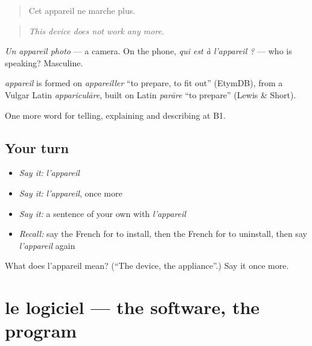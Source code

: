 \begin{quote}
Cet appareil ne marche plus.
\end{quote}

\begin{quote}
\emph{This device does not work any more.}
\end{quote}

\emph{Un appareil photo} — a camera. On the phone, \emph{qui est à l'appareil ?} — who is speaking? Masculine.

\begin{cousinweb}
\emph{appareil} is formed on \emph{appareiller} \textquotedblleft{}to prepare, to fit out\textquotedblright{} (EtymDB), from a Vulgar Latin \emph{appariculāre}, built on Latin \emph{parāre} \textquotedblleft{}to prepare\textquotedblright{} (Lewis \& Short).
\end{cousinweb}

\begin{grammarlens}[title={What you've built}]
One more word for telling, explaining and describing at B1.
\end{grammarlens}

\subsection*{Your turn}
\begin{itemize}
\raggedright
  \item \emph{Say it:} \emph{l'appareil}
  \item \emph{Say it:} \emph{l'appareil}, once more
  \item \emph{Say it:} a sentence of your own with \emph{l'appareil}
  \item \emph{Recall:} say the French for to install, then the French for to uninstall, then say \emph{l'appareil} again
\end{itemize}

\begin{tcolorbox}[breakable,colback=teal!4,colframe=teal!35!black,title={Before you move on}]
What does l'appareil mean? (\textquotedblleft{}The device, the appliance\textquotedblright{}.) Say it once more.
\end{tcolorbox}
\section[le logiciel]{le logiciel — the software, the program}

\label{lesson:FR-C396-logiciel}



